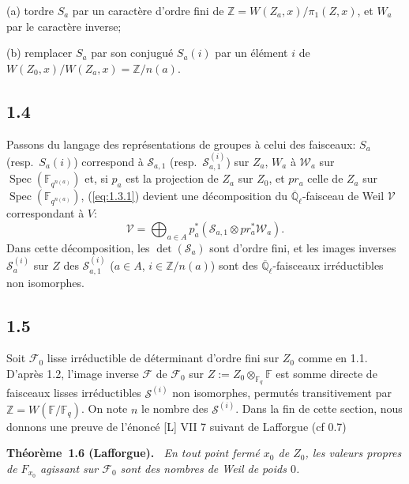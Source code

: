 \documentclass[11pt,a4paper]{article}
\makeatletter
\theoremstyle{plain}
\theoremstyle{definition}
\newenvironment{manualblock}[4]{%
  \par\medskip\noindent\textbf{#1~#2#3.}\def\@currentlabel{#2}\label{#4}\itshape\ }{\par\normalfont\medskip}
\DeclareMathOperator{\Spec}{Spec}
\makeatother
\begin{document}
(a) tordre $S_a$ par un caract\`ere d'ordre fini de $\mathbb{Z} = W(Z_a,x)/\pi_1(Z,x)$, et $W_a$ par le caract\`ere inverse;

(b) remplacer $S_a$ par son conjugu\'e $S_a(i)$ par un \'el\'ement $i$ de $W(Z_0,x)/W(Z_a,x) = \mathbb{Z}/n(a)$.

\subsection*{1.4}

Passons du langage des repr\'esentations de groupes \`a celui des faisceaux: $S_a$ (resp.~$S_a(i)$) correspond \`a $\mathcal{S}_{a,1}$ (resp.~$\mathcal{S}_{a,1}^{(i)}$) sur $Z_a$, $W_a$ \`a $\mathcal{W}_a$ sur $\Spec(\mathbb{F}_{q^{n(a)}})$ et, si $p_a$ est la projection de $Z_a$ sur $Z_0$, et $pr_a$ celle de $Z_a$ sur $\Spec(\mathbb{F}_{q^{n(a)}})$, (\ref{eq:1.3.1}) devient une d\'ecomposition du $\overline{\mathbb{Q}}_\ell$-faisceau de Weil $\mathcal{V}$ correspondant \`a $V$:
\begin{equation}\label{eq:1.4.1}
\mathcal{V} = \bigoplus_{a \in A} p_a^*(\mathcal{S}_{a,1} \otimes pr_a^* \mathcal{W}_a).
\end{equation}
Dans cette d\'ecomposition, les $\det(\mathcal{S}_a)$ sont d'ordre fini, et les images inverses $\mathcal{S}_a^{(i)}$ sur $Z$ des $\mathcal{S}_{a,1}^{(i)}$ ($a \in A$, $i \in \mathbb{Z}/n(a)$) sont des $\overline{\mathbb{Q}}_\ell$-faisceaux irr\'eductibles non isomorphes.

\subsection*{1.5}

Soit $\mathcal{F}_0$ lisse irr\'eductible de d\'eterminant d'ordre fini sur $Z_0$ comme en 1.1. D'apr\`es 1.2, l'image inverse $\mathcal{F}$ de $\mathcal{F}_0$ sur $Z := Z_0 \otimes_{\mathbb{F}_q} \mathbb{F}$ est somme directe de faisceaux lisses irr\'eductibles $\mathcal{S}^{(i)}$ non isomorphes, permut\'es transitivement par $\mathbb{Z} = W(\mathbb{F}/\mathbb{F}_q)$. On note $n$ le nombre des $\mathcal{S}^{(i)}$. Dans la fin de cette section, nous donnons une preuve de l'\'enonc\'e [L] VII 7 suivant de Lafforgue (cf 0.7)

\begin{manualblock}{Théorème}{1.6}{ (Lafforgue)}{thm:1.6}
En tout point ferm\'e $x_0$ de $Z_0$, les valeurs propres de $F_{x_0}$ agissant sur $\mathcal{F}_0$ sont des nombres de Weil de poids $0$.
\end{manualblock}
\end{document}
